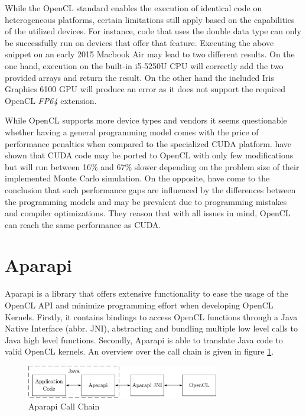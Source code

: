 While the OpenCL standard enables the execution of identical code on heterogeneous platforms, certain limitations still apply based on the capabilities of the utilized devices. For instance, code that uses the double data type can only be successfully run on devices that offer that feature. Executing the above snippet on an early 2015 Macbook Air may lead to two different results. On the one hand, execution on the built-in i5-5250U CPU will correctly add the two provided arrays and return the result. On the other hand the included Iris Graphics 6100 GPU will produce an error as it does not support the required OpenCL \textit{FP64} extension.

While OpenCL supports more device types and vendors it seems questionable whether having a general programming model comes with the price of performance penalties when compared to the specialized CUDA platform. \citeauthor{performance_comparison} have shown that CUDA code may be ported to OpenCL with only few modifications but will run between 16\% and 67\% slower depending on the problem size of their implemented Monte Carlo simulation\cite{performance_comparison}. On the opposite, \citeauthor{comprehensive_performance_comparison} have come to the conclusion that such performance gaps are influenced by the differences between the programming models and may be prevalent due to programming mistakes and compiler optimizations\cite{comprehensive_performance_comparison}. They reason that with all issues in mind, OpenCL can reach the same performance as CUDA.

\section{Aparapi}
\label{aparapi}
Aparapi is a library that offers extensive functionality to ease the usage of the OpenCL API and minimize programming effort when developing OpenCL Kernels\cite{aparapi}. Firstly, it contains bindings to access OpenCL functions through a Java Native Interface (abbr. JNI), abstracting and bundling multiple low level calls to Java high level functions. Secondly, Aparapi is able to translate Java code to valid OpenCL kernels. An overview over the call chain is given in figure \ref{img:aparapi_call_chain}.

\begin{figure}[!htb]	
	\includegraphics[width=0.75\textwidth]{drawings/aparapi_call_chain.pdf}
	\centering
	\caption{Aparapi Call Chain}
	\label{img:aparapi_call_chain}
\end{figure}

